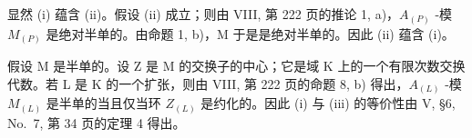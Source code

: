 显然 (i) 蕴含 (ii)。假设 (ii) 成立；则由 VIII, 第 222 页的推论 1, a)，\(A_{(P)}\) -模 \(M_{(P)}\) 是绝对半单的。由命题 1, b)，M 于是是绝对半单的。因此 (ii) 蕴含 (i)。

假设 M 是半单的。设 Z 是 M 的交换子的中心；它是域 K 上的一个有限次数交换代数。若 L 是 K 的一个扩张，则由 VIII, 第 222 页的命题 8, b) 得出，\(A_{(L)}\) -模 \(M_{(L)}\) 是半单的当且仅当环 \(Z_{(L)}\) 是约化的。因此 (i) 与 (iii) 的等价性由 V, §6, No.~7, 第 34 页的定理 4 得出。

